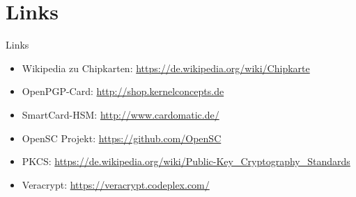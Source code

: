 \documentclass{beamer}
\begin{document}
\section{Links}
\begin{frame}[fragile]{Links}
\begin{minipage}[t][\textheight][t]{\linewidth}
\begin{itemize}
  \item Wikipedia zu Chipkarten: \url{https://de.wikipedia.org/wiki/Chipkarte}
  \item OpenPGP-Card: \url{http://shop.kernelconcepts.de}
  \item SmartCard-HSM: \url{http://www.cardomatic.de/}
  \item OpenSC Projekt: \url{https://github.com/OpenSC}
  \item PKCS:
  \url{https://de.wikipedia.org/wiki/Public-Key_Cryptography_Standards}
  \item Veracrypt: \url{https://veracrypt.codeplex.com/}
\end{itemize}
\end{minipage}
\end{frame}
\end{document}
